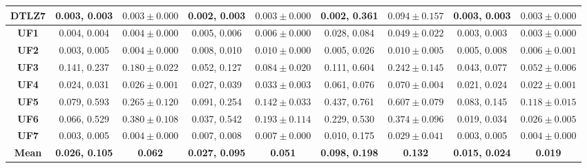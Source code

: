 \begin{table*}[t]
{\begin{tabular}{c|c|c|c|c|c|c|c|c|}
\multicolumn{1}{|c|}{\textbf{DTLZ7}} & 0.003, 0.003            & $0.003 \pm 0.000$       & 0.002, 0.003            & $0.003 \pm 0.000$       & 0.002, 0.361            & $0.094 \pm 0.157$       & 0.003, 0.003            & $0.003 \pm 0.000$       \\ \hline
\multicolumn{1}{|c|}{\textbf{UF1}}   & 0.004, 0.004            & $0.004 \pm 0.000$       & 0.005, 0.006            & $0.006 \pm 0.000$       & 0.028, 0.084            & $0.049 \pm 0.022$       & 0.003, 0.003            & $0.003 \pm 0.000$       \\ \hline
\multicolumn{1}{|c|}{\textbf{UF2}}   & 0.003, 0.005            & $0.004 \pm 0.000$       & 0.008, 0.010            & $0.010 \pm 0.000$       & 0.005, 0.026            & $0.010 \pm 0.005$       & 0.005, 0.008            & $0.006 \pm 0.001$       \\ \hline
\multicolumn{1}{|c|}{\textbf{UF3}}   & 0.141, 0.237            & $0.180 \pm 0.022$       & 0.052, 0.127            & $0.084 \pm 0.020$       & 0.111, 0.604            & $0.242 \pm 0.145$       & 0.043, 0.077            & $0.052 \pm 0.006$       \\ \hline
\multicolumn{1}{|c|}{\textbf{UF4}}   & 0.024, 0.031            & $0.026 \pm 0.001$       & 0.027, 0.039            & $0.033 \pm 0.003$       & 0.061, 0.076            & $0.070 \pm 0.004$       & 0.021, 0.024            & $0.022 \pm 0.001$       \\ \hline
\multicolumn{1}{|c|}{\textbf{UF5}}   & 0.079, 0.593            & $0.265 \pm 0.120$       & 0.091, 0.254            & $0.142 \pm 0.033$       & 0.437, 0.761            & $0.607 \pm 0.079$       & 0.083, 0.145            & $0.118 \pm 0.015$       \\ \hline
\multicolumn{1}{|c|}{\textbf{UF6}}   & 0.066, 0.529            & $0.380 \pm 0.108$       & 0.037, 0.542            & $0.193 \pm 0.114$       & 0.229, 0.530            & $0.374 \pm 0.096$       & 0.019, 0.034            & $0.026 \pm 0.005$       \\ \hline
\multicolumn{1}{|c|}{\textbf{UF7}}   & 0.003, 0.005            & $0.004 \pm 0.000$       & 0.007, 0.008            & $0.007 \pm 0.000$       & 0.010, 0.175            & $0.029 \pm 0.041$       & 0.003, 0.005            & $0.004 \pm 0.000$       \\ \hline
\multicolumn{1}{|c|}{\textbf{Mean}}  & \textbf{0.026, 0.105}   & \textbf{0.062}          & \textbf{0.027, 0.095}   & \textbf{0.051}          & \textbf{0.098, 0.198}   & \textbf{0.132}          & \textbf{0.015, 0.024}   & \textbf{0.019}          \\ \hline
\end{tabular}%
}
\end{table*}
